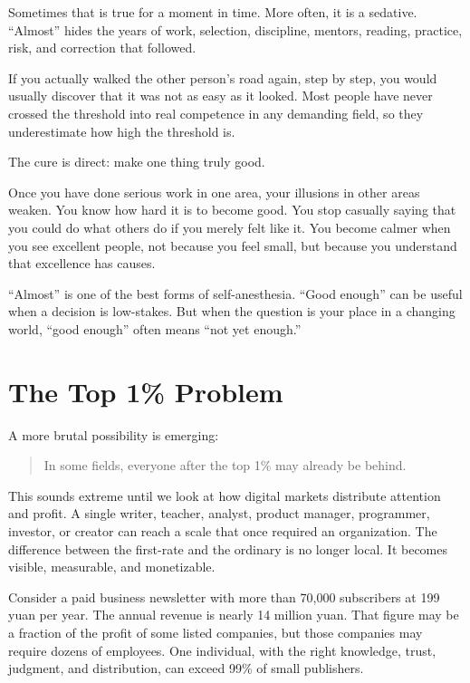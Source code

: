 Sometimes that is true for a moment in time. More often, it is a sedative. ``Almost'' hides the years of work, selection, discipline, mentors, reading, practice, risk, and correction that followed.

If you actually walked the other person's road again, step by step, you would usually discover that it was not as easy as it looked. Most people have never crossed the threshold into real competence in any demanding field, so they underestimate how high the threshold is.

The cure is direct: make one thing truly good.

Once you have done serious work in one area, your illusions in other areas weaken. You know how hard it is to become good. You stop casually saying that you could do what others do if you merely felt like it. You become calmer when you see excellent people, not because you feel small, but because you understand that excellence has causes.

``Almost'' is one of the best forms of self-anesthesia. ``Good enough'' can be useful when a decision is low-stakes. But when the question is your place in a changing world, ``good enough'' often means ``not yet enough.''

\section*{The Top 1\% Problem}

A more brutal possibility is emerging:

\begin{quote}
In some fields, everyone after the top 1\% may already be behind.
\end{quote}

This sounds extreme until we look at how digital markets distribute attention and profit. A single writer, teacher, analyst, product manager, programmer, investor, or creator can reach a scale that once required an organization. The difference between the first-rate and the ordinary is no longer local. It becomes visible, measurable, and monetizable.

Consider a paid business newsletter with more than 70,000 subscribers at 199 yuan per year. The annual revenue is nearly 14 million yuan. That figure may be a fraction of the profit of some listed companies, but those companies may require dozens of employees. One individual, with the right knowledge, trust, judgment, and distribution, can exceed 99\% of small publishers.

